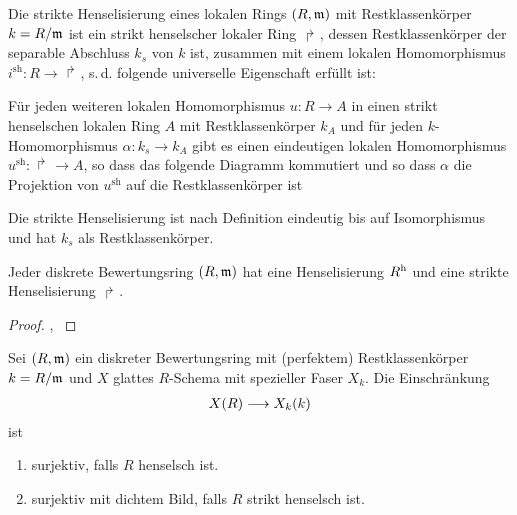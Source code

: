 \documentclass[german]{scrreprt}
\begin{document}
\begin{Definition}\label{def:striktehenselisierung}
  Die strikte Henselisierung eines lokalen Rings $(R,\mathfrak{m})$ mit
  Restklassenkörper $k=R/\mathfrak{m}$ ist ein strikt henselscher lokaler Ring
  $\Rsh$, dessen Restklassenkörper der separable Abschluss $k_s$ von
  $k$ ist, zusammen mit einem lokalen Homomorphismus
  $i^\text{sh}\colon R\to\Rsh$, s.\,d. folgende universelle
  Eigenschaft erfüllt ist:
  
  Für jeden weiteren lokalen Homomorphismus $u\colon R\to A$ in einen
  strikt henselschen lokalen Ring $A$ mit Restklassenkörper $k_A$ und
  für jeden $k$-Homomorphismus $\alpha\colon k_s\to k_A$ gibt es einen
  eindeutigen lokalen Homomorphismus $u^\text{sh}\colon\Rsh\to A$, so
  dass das folgende Diagramm kommutiert und so dass $\alpha$ die
  Projektion von $u^\text{sh}$ auf die Restklassenkörper ist
  \begin{center}
  \end{center}

  Die strikte Henselisierung ist nach Definition eindeutig bis auf
  Isomorphismus und hat $k_s$ als Restklassenkörper.
\end{Definition}

\begin{Satz}\label{thm:exhenselisierung}
  \cite[Proposition IV.6.5]{silverman2}
  Jeder diskrete Bewertungsring $(R,\mathfrak{m})$ hat eine Henselisierung $R^{\text{h}}$
  und eine strikte Henselisierung $\Rsh$.
  \begin{proof}
    \cite[Proposition IV.6.5]{silverman2},
    \cite[Remark IV.6.6.2]{silverman2}
    \cite[Chapter 2.3, S. 48]{neron}
  \end{proof}
\end{Satz}

\begin{Satz}\label{thm:eigstrikthenselsch}
  \cite[Proposition IV.6.4]{silverman2}
  Sei $(R,\mathfrak{m})$ ein diskreter Bewertungsring mit (perfektem)
  Restklassenkörper $k=R/\mathfrak{m}$ und $X$ glattes $R$-Schema mit spezieller
  Faser $X_k$.
  Die Einschränkung
  \begin{gather*}
    X(R)\longrightarrow X_k(k)
  \end{gather*}
  ist
  \begin{enumerate}[label=(\roman*)]
  \item surjektiv, falls $R$ henselsch ist.
  \item surjektiv mit dichtem Bild, falls $R$ strikt henselsch ist.
  \end{enumerate}
\end{Satz}
\end{document}
